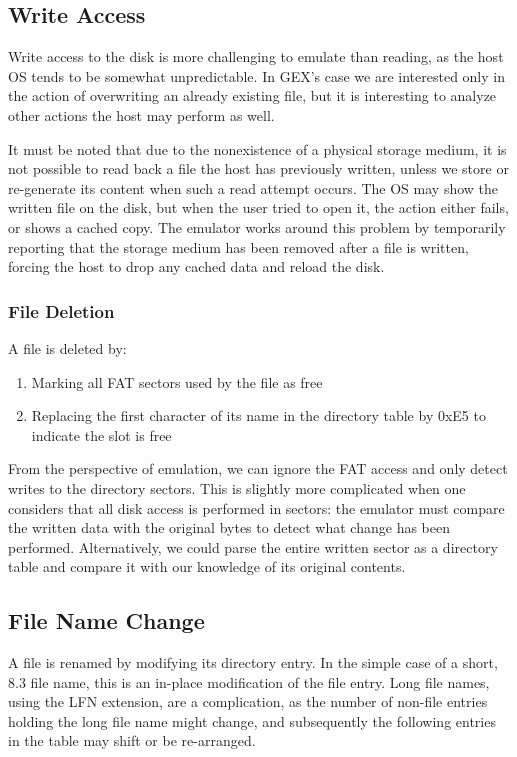 \subsection{Write Access}

Write access to the disk is more challenging to emulate than reading, as the host OS tends to be somewhat unpredictable. In GEX's case we are interested only in the action of overwriting an already existing file, but it is interesting to analyze other actions the host may perform as well.

It must be noted that due to the nonexistence of a physical storage medium, it is not possible to read back a file the host has previously written, unless we store or re-generate its content when such a read attempt occurs. The \gls{OS} may show the written file on the disk, but when the user tried to open it, the action either fails, or shows a cached copy. The emulator works around this problem by temporarily reporting that the storage medium has been removed after a file is written, forcing the host to drop any cached data and reload the disk.

\subsubsection{File Deletion}

A file is deleted by:

\begin{enumerate}
	\item Marking all \gls{FAT} sectors used by the file as free
	\item Replacing the first character of its name in the directory table by 0xE5 to indicate the slot is free
\end{enumerate}

From the perspective of emulation, we can ignore the \gls{FAT} access and only detect writes to the directory sectors. This is slightly more complicated when one considers that all disk access is performed in sectors: the emulator must compare the written data with the original bytes to detect what change has been performed. Alternatively, we could parse the entire written sector as a directory table and compare it with our knowledge of its original contents.

\subsection{File Name Change}

A file is renamed by modifying its directory entry. In the simple case of a short, 8.3 file name, this is an in-place modification of the file entry. Long file names, using the \gls{LFN} extension, are a complication, as the number of non-file entries holding the long file name might change, and subsequently the following entries in the table may shift or be re-arranged.

